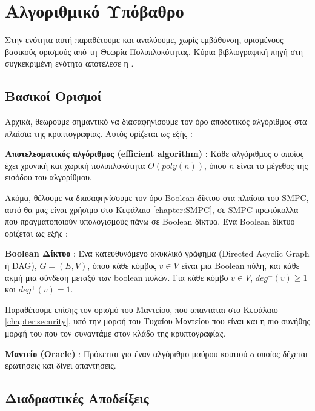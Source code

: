 \section{Αλγοριθμικό Υπόβαθρο}
\label{section:algorithmic-background}

Στην ενότητα αυτή παραθέτουμε και αναλύουμε, χωρίς εμβάθυνση, ορισμένους βασικούς ορισμούς από τη Θεωρία Πολυπλοκότητας. Κύρια βιβλιογραφική πηγή στη συγκεκριμένη ενότητα αποτέλεσε η \cite{Bauer2011}.

\subsection{Βασικοί Ορισμοί}

Αρχικά, θεωρούμε σημαντικό να διασαφηνίσουμε τον όρο αποδοτικός αλγόριθμος στα πλαίσια της κρυπτογραφίας. Αυτός ορίζεται ως εξής :

\begin{definition}
\textbf{Αποτελεσματικός αλγόριθμος (efficient algorithm)} : Κάθε αλγόριθμος ο οποίος έχει χρονική και χωρική πολυπλοκότητα $O(poly(n))$, όπου $n$ είναι το μέγεθος της εισόδου του αλγορίθμου.
\end{definition}

Ακόμα, θέλουμε να διασαφηνίσουμε τον όρο Boolean δίκτυο στα πλαίσια του SMPC, αυτό θα μας είναι χρήσιμο στο Κεφάλαιο \ref{chapter:SMPC}, σε SMPC πρωτόκολλα που πραγματοποιούν υπολογισμούς πάνω σε Boolean δίκτυα. Ένα Boolean δίκτυο ορίζεται ως εξής :

\begin{definition}
\textbf{Boolean Δίκτυο} : Ένα κατευθυνόμενο ακυκλικό γράφημα (Directed Acyclic Graph ή DAG), $G=(E, V)$, όπου κάθε κόμβος $v \in V$ είναι μια Boolean πύλη, και κάθε ακμή μια σύνδεση μεταξύ των boolean πυλών. Για κάθε κόμβο $v \in V$, $deg^-(v) \ge 1$ και $deg^+(v) = 1$.
\end{definition}

Παραθέτουμε επίσης τον ορισμό του Μαντείου, που απαντάται στο Κεφάλαιο \ref{chapter:security}, υπό την μορφή του Τυχαίου Μαντείου που είναι και η πιο συνήθης μορφή του που τον συναντάμε στον κλάδο της κρυπτογραφίας.

\begin{definition}
\textbf{Μαντείο (Oracle)} : Πρόκειται για έναν αλγόριθμο μαύρου κουτιού o οποίος δέχεται ερωτήσεις και δίνει απαντήσεις.
\end{definition}

\subsection{Διαδραστικές Αποδείξεις}

